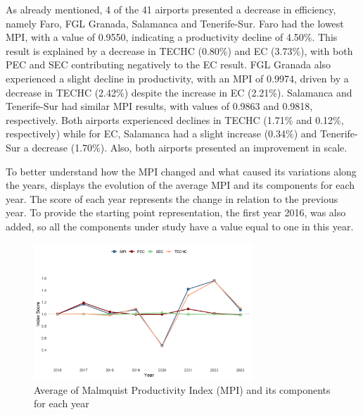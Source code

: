 As already mentioned, 4 of the 41 airports presented a decrease in efficiency, namely Faro, FGL Granada, Salamanca and Tenerife-Sur. Faro had the lowest MPI, with a value of 0.9550, indicating a productivity
decline of 4.50\%. This result is explained by a decrease in TECHC (0.80\%) and EC (3.73\%), with both
PEC and SEC contributing negatively to the EC result. FGL Granada also experienced a
slight decline in productivity, with an MPI of 0.9974, driven by a decrease in TECHC (2.42\%) despite the
increase in EC (2.21\%). Salamanca and Tenerife-Sur had similar MPI results, with values of 0.9863 and
0.9818, respectively. Both airports experienced declines in TECHC (1.71\% and 0.12\%, respectively)
while for EC, Salamanca had a slight increase (0.34\%) and Tenerife-Sur a decrease (1.70\%). Also, both
airports presented an improvement in scale.

To better understand how the MPI changed and what caused its variations along the years, 
displays the evolution of the average MPI and its components for each year. The score of each year
represents the change in relation to the previous year. To provide the starting point representation, the
first year 2016, was also added, so all the components under study have a value equal to one in this
year.
\vspace{-0.5cm}
\begin{figure}[H]
  \centering
  \includegraphics[width=8.2cm]{images/malmquist_plot.png}
  \vspace{-0.5cm}
  \caption{Average of Malmquist Productivity Index (MPI) and its components for each year}
  \label{fig:malmquist}
\end{figure}
\vspace{-0.5cm}

